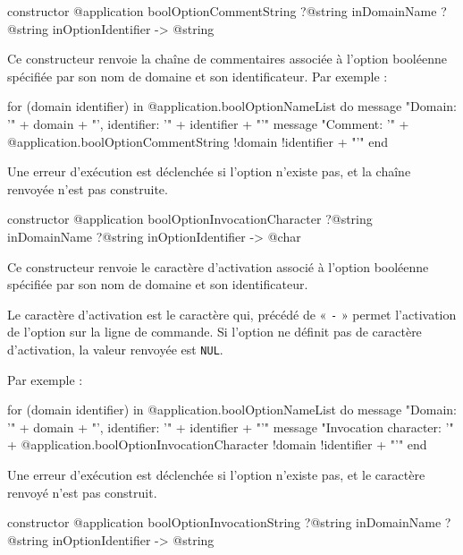 
\begin{galgasbox}
constructor @application boolOptionCommentString
    ?@string inDomainName
    ?@string inOptionIdentifier -> @string
\end{galgasbox}

Ce constructeur renvoie la chaîne de commentaires associée à l'option booléenne spécifiée par son nom de domaine et son identificateur. Par exemple :
\begin{galgas}
for (domain identifier) in @application.boolOptionNameList do
  message "Domain: '" + domain + "', identifier: '" + identifier + "'\n"
  message "Comment: '"
    + @application.boolOptionCommentString {!domain !identifier} + "'\n"
end
\end{galgas}

Une erreur d'exécution est déclenchée si l'option n'existe pas, et la chaîne renvoyée n'est pas construite.



\begin{galgasbox}
constructor @application boolOptionInvocationCharacter
    ?@string inDomainName
    ?@string inOptionIdentifier -> @char
\end{galgasbox}

Ce constructeur renvoie le caractère d'activation associé à l'option booléenne spécifiée par son nom de domaine et son identificateur.

Le caractère d'activation est le caractère qui, précédé de « \texttt{-} » permet l'activation de l'option sur la ligne de commande. Si l'option ne définit pas de caractère d'activation, la valeur renvoyée est \texttt{NUL}.

 Par exemple :
\begin{galgas}
for (domain identifier) in @application.boolOptionNameList do
  message "Domain: '" + domain + "', identifier: '" + identifier + "'\n"
  message "Invocation character: '"
    + @application.boolOptionInvocationCharacter {!domain !identifier} + "'\n"
end
\end{galgas}

Une erreur d'exécution est déclenchée si l'option n'existe pas, et le caractère renvoyé n'est pas construit.



\begin{galgasbox}
constructor @application boolOptionInvocationString
    ?@string inDomainName
    ?@string inOptionIdentifier -> @string
\end{galgasbox}

